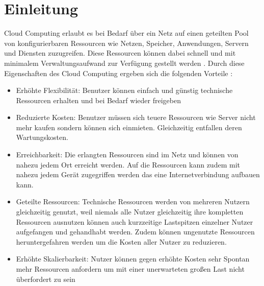 \section{Einleitung}


Cloud Computing erlaubt es bei Bedarf über ein Netz auf einen geteilten Pool von konfigurierbaren Ressourcen wie Netzen, Speicher, Anwendungen, Servern und Diensten zuzugreifen. Diese Ressourcen können dabei schnell und mit minimalem Verwaltungsaufwand zur Verfügung gestellt werden \cite{mell2011}. 
Durch diese Eigenschaften des Cloud Computing ergeben sich die folgenden Vorteile \cite{ganesh2014}:
\begin{itemize}
\item 
Erhöhte Flexibilität: Benutzer können einfach und günstig technische Ressourcen erhalten und bei Bedarf wieder freigeben
\item
Reduzierte Kosten: Benutzer müssen sich teuere Ressourcen wie Server nicht mehr kaufen sondern können sich einmieten. Gleichzeitig entfallen deren Wartungskosten. 
\item
Erreichbarkeit: Die erlangten Ressourcen sind im Netz und können von nahezu jedem Ort erreicht werden. Auf die Ressourcen kann zudem mit nahezu jedem Gerät zugegriffen werden das eine Internetverbindung aufbauen kann.
\item
Geteilte Ressourcen: Technische Ressourcen werden von mehreren Nutzern gleichzeitig genutzt, weil niemals alle Nutzer gleichzeitig ihre kompletten Ressourcen ausnutzen können auch kurzzeitige Lastspitzen einzelner Nutzer aufgefangen und gehandhabt werden. Zudem können ungenutzte Ressourcen heruntergefahren werden um die Kosten aller Nutzer zu reduzieren.
\item
Erhöhte Skalierbarkeit: Nutzer können gegen erhöhte Kosten sehr Spontan mehr Ressourcen anfordern um mit einer unerwarteten großen Last nicht überfordert zu sein
\end{itemize}


